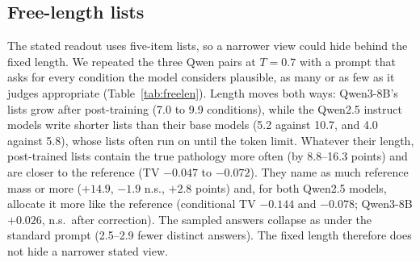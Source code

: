 \documentclass[11pt]{article}
\begin{document}
\subsection{Free-length lists}\label{sec:freelen}
The stated readout uses five-item lists, so a narrower view could hide behind the fixed length. We repeated the three Qwen pairs at $T{=}0.7$ with a prompt that asks for every condition the model considers plausible, as many or as few as it judges appropriate (Table~\ref{tab:freelen}). Length moves both ways: Qwen3-8B's lists grow after post-training (7.0 to 9.9 conditions), while the Qwen2.5 instruct models write shorter lists than their base models (5.2 against 10.7, and 4.0 against 5.8), whose lists often run on until the token limit. Whatever their length, post-trained lists contain the true pathology more often (by 8.8--16.3 points) and are closer to the reference (TV $-0.047$ to $-0.072$). They name as much reference mass or more ($+14.9$, $-1.9$ n.s., $+2.8$ points) and, for both Qwen2.5 models, allocate it more like the reference (conditional TV $-0.144$ and $-0.078$; Qwen3-8B $+0.026$, n.s.\ after correction). The sampled answers collapse as under the standard prompt (2.5--2.9 fewer distinct answers). The fixed length therefore does not hide a narrower stated view.
\end{document}
